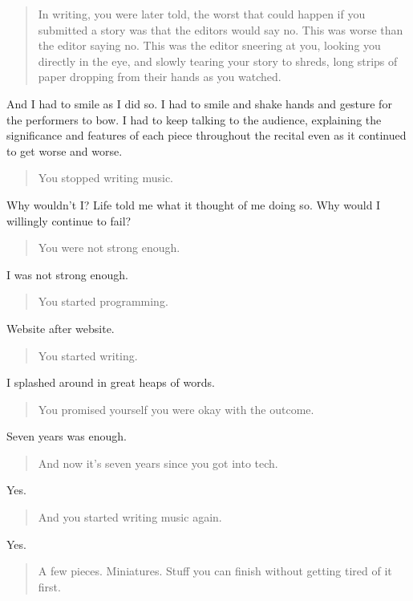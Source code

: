 \begin{quote}
In writing, you were later told, the worst that could happen if you submitted a story was that the editors would say no. This was worse than the editor saying no. This was the editor sneering at you, looking you directly in the eye, and slowly tearing your story to shreds, long strips of paper dropping from their hands as you watched.
\end{quote}

And I had to smile as I did so. I had to smile and shake hands and gesture for the performers to bow. I had to keep talking to the audience, explaining the significance and features of each piece throughout the recital even as it continued to get worse and worse.

\begin{quote}
You stopped writing music.
\end{quote}

Why wouldn't I? Life told me what it thought of me doing so. Why would I willingly continue to fail?

\begin{quote}
You were not strong enough.
\end{quote}

I was not strong enough.

\begin{quote}
You started programming.
\end{quote}

Website after website.

\begin{quote}
You started writing.
\end{quote}

I splashed around in great heaps of words.

\begin{quote}
You promised yourself you were okay with the outcome.
\end{quote}

Seven years was enough.

\begin{quote}
And now it's seven years since you got into tech.
\end{quote}

Yes.

\begin{quote}
And you started writing music again.
\end{quote}

Yes.

\begin{quote}
A few pieces. Miniatures. Stuff you can finish without getting tired of it first.
\end{quote}

